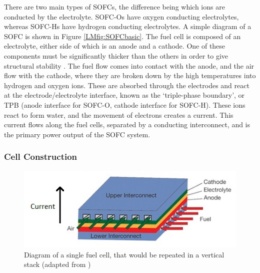 \documentclass{article}
\begin{document}
    
    There are two main types of SOFCs, the difference being which ions are conducted by the electrolyte. SOFC-Os have oxygen conducting electrolytes, whereas SOFC-Hs have hydrogen conducting electrolytes. 
A simple diagram of a SOFC is shown in Figure \ref{LMfig:SOFCbasic}. The fuel cell is composed of an electrolyte, either side of which is an anode and a cathode. One of these components must be significantly thicker than the others in order to give structural stability \cite{LM2}. The fuel flow comes into contact with the anode, and the air flow with the cathode, where they are broken down by the high temperatures into hydrogen and oxygen ions. These are absorbed through the electrodes and react at the electrode/electrolyte interface, known as the `triple-phase boundary', or TPB (anode interface for SOFC-O, cathode interface for SOFC-H). These ions react to form water, and the movement of electrons creates a current. This current flows along the fuel cells, separated by a conducting interconnect, and is the primary power output of the SOFC system.


    \subsubsection{Cell Construction}
    
    
     \begin{figure}[h]
        \centering
        \includegraphics[scale = 4]{fuelcelldiagramedit.jpg}
        \caption{Diagram of a single fuel cell, that would be repeated in a vertical stack (adapted from \cite{LM8})}
        \label{LMfig:SOFCconstruction}
    \end{figure}
    
\end{document}
